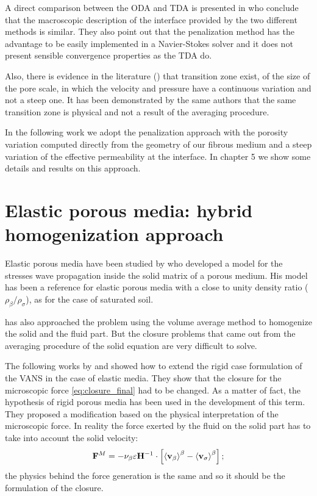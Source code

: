 A direct comparison between the ODA and TDA is presented in \citet{cimolin2013navier} who conclude that the macroscopic description of the interface provided by the two different methods is similar. They also point out that the penalization method has the advantage to be easily implemented in a Navier-Stokes solver and it does not present sensible convergence properties as the TDA do.

Also, there is evidence in the literature (\citet{ochoa2017fluid}) that transition zone exist, of the size of the pore scale, in which the velocity and pressure have a continuous variation and not a steep one. It has been demonstrated by the same authors that the same transition zone is physical and not a result of the averaging procedure.

In the following work we adopt the penalization approach with the porosity variation computed directly from the geometry of our fibrous medium and a steep variation of the effective permeability at the interface. In chapter 5 we show some details and results on this approach.


\section{Elastic porous media: hybrid homogenization approach}
\label{ph:moving}

Elastic porous media have been studied by \citet{biot1956theory} who developed a model for the stresses wave propagation inside the solid matrix of a porous medium.
His model has been a reference for elastic porous media with a close to unity density ratio ($\rho_{\beta}/\rho_{\sigma}$), as for the case of saturated soil.

\citet{whitaker1986deformable} has also approached the problem using the volume average method to homogenize the solid and the fluid part.
But the closure problems that came out from the averaging procedure of the solid equation are very difficult to solve. 

The following works by \citet{hussong2011continuum} and \citet{wang2015volume} showed how to extend the rigid case formulation of the VANS in the case of elastic media.
They show that the closure for the microscopic force \eqref{eq:closure_final} had to be changed. As a matter of fact, the hypothesis of rigid porous media has been used in the development of this term.
They proposed a modification based on the physical interpretation of the microscopic force. In reality the force exerted by the fluid on the solid part has to take into account the solid velocity:
$$
\mathbf{F}^M = - \nu_{\beta} \varepsilon \mathbf{H}^{-1} \cdot \left[ {\left< \textbf{v}_{\beta} \right>}^{\beta} - {\left< \textbf{v}_{\sigma} \right>}^{\beta} \right];
$$
the physics behind the force generation is the same and so it should be the formulation of the closure.

